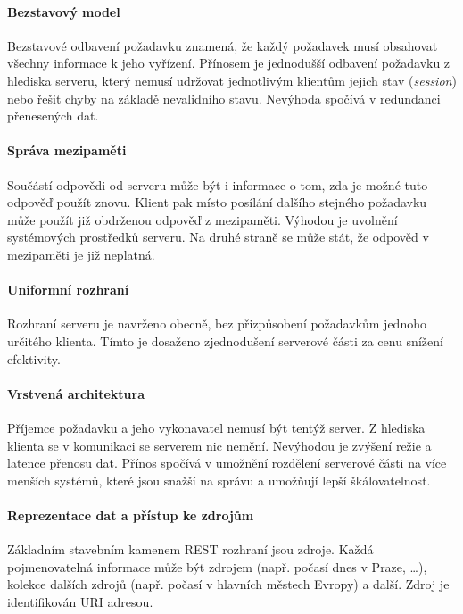 \paragraph{Bezstavový model}

Bezstavové odbavení požadavku znamená, že každý požadavek musí obsahovat všechny informace k jeho vyřízení.
Přínosem je jednodušší odbavení požadavku z hlediska serveru, který nemusí udržovat jednotlivým klientům jejich stav (\textit{session}) nebo řešit chyby na základě nevalidního stavu.
Nevýhoda spočívá v redundanci přenesených dat.

\paragraph{Správa mezipaměti}

Součástí odpovědi od serveru může být i informace o tom, zda je možné tuto odpověď použít znovu.
Klient pak místo posílání dalšího stejného požadavku může použít již obdrženou odpověď z mezipaměti.
Výhodou je uvolnění systémových prostředků serveru.
Na druhé straně se může stát, že odpověď v mezipaměti je již neplatná.

\paragraph{Uniformní rozhraní}

Rozhraní serveru je navrženo obecně, bez přizpůsobení požadavkům jednoho určitého klienta.
Tímto je dosaženo zjednodušení serverové části za cenu snížení efektivity.

\paragraph{Vrstvená architektura}

Příjemce požadavku a jeho vykonavatel nemusí být tentýž server.
Z hlediska klienta se v komunikaci se serverem nic nemění.
Nevýhodou je zvýšení režie a latence přenosu dat.
Přínos spočívá v umožnění rozdělení serverové části na více menších systémů, které jsou snažší na správu a umožňují lepší škálovatelnost.

\paragraph{Reprezentace dat a přístup ke zdrojům}

Základním stavebním kamenem REST rozhraní jsou zdroje.
Každá pojmenovatelná informace může být zdrojem (např. počasí dnes v Praze, \ldots), kolekce dalších zdrojů (např. počasí v hlavních městech Evropy) a další.
Zdroj je identifikován URI adresou.
\cite{rest_zdroje}

